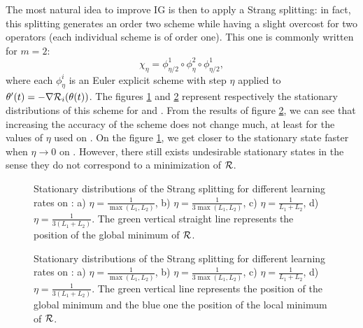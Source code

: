 The most natural idea to improve IG is then to apply a Strang splitting: in fact, this splitting generates an order two scheme while having a slight overcost for two operators
(each individual scheme is of order one). This one is commonly written for $m=2$:
\begin{equation*}
	\chi_{\eta} = \phi_{\eta/2}^1 \circ \phi_{\eta}^2 \circ \phi_{\eta/2}^1,
\end{equation*}
where each $\phi_{\eta}^i$ is an Euler explicit scheme with step $\eta$ applied to $\theta'(t) = -\nabla \mathcal{R}_i(\theta(t))$.
The figures \ref{Strang_ex1} and \ref{Strang_ex2} represent respectively the stationary distributions of this scheme for \exOne and \exTwo. From the results of figure
\ref{Strang_ex2}, we can see that increasing the accuracy of the scheme does not change much, at least for the values of $\eta$ used on \exTwo. On the figure \ref{Strang_ex1}, we get closer to the stationary state faster when $\eta \to 0$ on
\exOne. However, there still exists undesirable stationary states in the sense they do not correspond to a minimization of $\mathcal{R}$. 

\begin{figure}[h!]
	\centering
	\scalebox{0.45}{}
	\caption{Stationary distributions of the Strang splitting for different learning rates on \exOne: a) $\eta=\frac{1}{\max(L_1,L_2)}$, b) $\eta=\frac{1}{3\max(L_1,L_2)}$, c) $\eta=\frac{1}{L_1+L_2}$, d) $\eta=\frac{1}{3(L_1+L_2)}$. The green vertical straight line represents the position of the global minimum of $\mathcal{R}$.}
	\label{Strang_ex1}
\end{figure}

\begin{figure}[h!]
	\centering
	\scalebox{0.45}{}
	\caption{Stationary distributions of the Strang splitting for different learning rates on \exTwo: a) $\eta=\frac{1}{\max(L_1,L_2)}$, b) $\eta=\frac{1}{3\max(L_1,L_2)}$, c) $\eta=\frac{1}{L_1+L_2}$, d) $\eta=\frac{1}{3(L_1+L_2)}$. The green vertical line represents the position of the global minimum and the blue one the position of the local minimum of $\mathcal{R}$.}
	\label{Strang_ex2}
\end{figure} 

